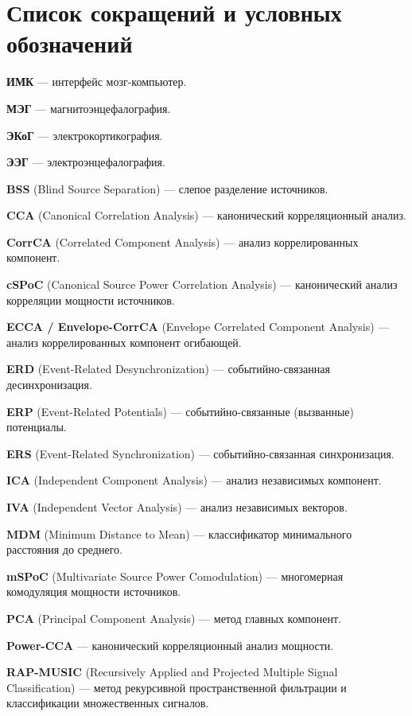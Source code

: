 \chapter*{Список сокращений и условных обозначений}             

\textbf{ИМК} --- интерфейс мозг-компьютер.

\textbf{МЭГ} --- магнитоэнцефалография.

\textbf{ЭКоГ} --- электрокортикография.

\textbf{ЭЭГ} --- электроэнцефалография.

\textbf{BSS} (Blind Source Separation) --- слепое разделение источников.

\textbf{CCA} (Canonical Correlation Analysis) --- канонический корреляционный анализ.

\textbf{CorrCA} (Correlated Component Analysis) --- анализ коррелированных компонент.

\textbf{cSPoC} (Canonical Source Power Correlation Analysis) --- канонический анализ корреляции мощности источников.

\textbf{ECCA / Envelope-CorrCA} (Envelope Correlated Component Analysis) --- анализ коррелированных компонент огибающей.

\textbf{ERD} (Event-Related Desynchronization) --- событийно-связанная десинхронизация.

\textbf{ERP} (Event-Related Potentials) --- событийно-связанные (вызванные) потенциалы.

\textbf{ERS} (Event-Related Synchronization) --- событийно-связанная синхронизация.

\textbf{ICA} (Independent Component Analysis) --- анализ независимых компонент.

\textbf{IVA} (Independent Vector Analysis) --- анализ независимых векторов.

\textbf{MDM} (Minimum Distance to Mean) --- классификатор минимального расстояния до среднего.

\textbf{mSPoC} (Multivariate Source Power Comodulation) --- многомерная комодуляция мощности источников.

\textbf{PCA} (Principal Component Analysis) --- метод главных компонент.

\textbf{Power-CCA} --- канонический корреляционный анализ мощности.

\textbf{RAP-MUSIC} (Recursively Applied and Projected Multiple Signal Classification) --- метод рекурсивной пространственной фильтрации и классификации множественных сигналов.

